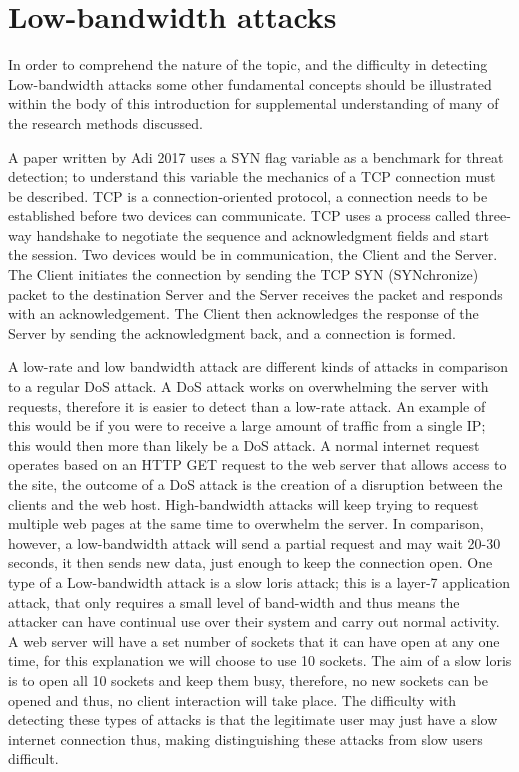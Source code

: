 
\section{Low-bandwidth attacks} \label{attack1}

In order to comprehend the nature of the topic, and the difficulty in detecting Low-bandwidth attacks some other fundamental concepts should be illustrated within the body of this introduction for supplemental understanding of many of the research methods discussed.

A paper written by Adi 2017 uses a SYN flag variable as a benchmark for threat detection; to understand this variable the mechanics of a TCP connection must be described. TCP is a connection-oriented protocol, a connection needs to be established before two devices can communicate. TCP uses a process called three-way handshake to negotiate the sequence and acknowledgment fields and start the session. Two devices would be in communication, the Client and the Server. The Client initiates the connection by sending the TCP SYN (SYNchronize) packet to the destination Server and the Server receives the packet and responds with an acknowledgement. The Client then acknowledges the response of the Server by sending the acknowledgment back, and a connection is formed. 

A low-rate and low bandwidth attack are different kinds of attacks in comparison to a regular DoS attack. A DoS attack works on overwhelming the server with requests, therefore it is easier to detect than a low-rate attack. An example of this would be if you were to receive a large amount of traffic from a single IP; this would then more than likely be a DoS attack. A normal internet request operates based on an HTTP GET request to the web server that allows access to the site, the outcome of a DoS attack is the creation of a disruption between the clients and the web host. High-bandwidth attacks will keep trying to request multiple web pages at the same time to overwhelm the server. In comparison, however, a low-bandwidth attack  will send a partial request and may wait 20-30 seconds, it then sends new data, just enough to keep the connection open. One type of a Low-bandwidth attack is a slow loris attack; this is a layer-7 application attack, that only requires a small level of band-width and thus means the attacker can have continual use over their system and carry out normal activity. A web server will have a set number of sockets that it can have open at any one time, for this explanation we will choose to use 10 sockets. The aim of a slow loris is to open all 10 sockets and keep them busy, therefore, no new sockets can be opened and thus, no client interaction will take place. The difficulty with detecting these types of attacks is that the legitimate user may just have a slow internet connection thus, making distinguishing these attacks from slow users difficult. 
